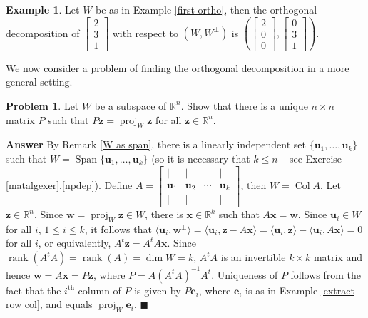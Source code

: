 \documentclass[12pt,letterpaper]{book}
\numberwithin{equation}{section}
\theoremstyle{definition}
\newtheorem{problem}[thm]{\textbf{Problem}}
\newtheorem{example}[thm]{\textbf{Example}}
\newenvironment{answer}{\noindent\textbf{Answer}}{\hfill$\blacksquare$\vspace{0.1in}}
\newcommand{\vu}{\bm{u}}
\newcommand{\vw}{\bm{w}}
\newcommand{\vx}{\bm{x}}
\newcommand{\vz}{\bm{z}}
\newcommand{\Coll}{\operatorname{Col}}
\newcommand{\Span}{\operatorname{Span}}
\newcommand{\rank}{\operatorname{rank}}
\begin{document}
\begin{example}
Let $W$ be as in Example \ref{first ortho}, then the orthogonal decomposition of $\left[\begin{array}{r} 2 \\ 3 \\ 1 \end{array}\right]$ with respect to $(W,W^\perp)$ is $\left(\left[\begin{array}{r} 2 \\ 0 \\ 0 \end{array}\right], \left[\begin{array}{r} 0 \\ 3 \\ 1 \end{array}\right]\right)$.
\end{example}

We now consider a problem of finding the orthogonal decomposition in a more general setting.

\begin{problem}\label{gensol}
Let $W$ be a subspace of $\mathbb{R}^n$. Show that there is a unique $n\times n$ matrix $P$ such that $P\vz=\operatorname{proj}_W \vz$ for all $\vz \in \mathbb{R}^n$.
\end{problem}

\begin{answer}
By Remark \ref{W as span}, there is a linearly independent set $\{\vu_1,\ldots,\vu_k\}$ such that $W=\Span\{\vu_1,\ldots,\vu_k\}$ (so it is necessary that $k\leq n$ -- see Exercise \ref{matalgexer}.\ref{npdep}). Define $A=\left[\begin{array}{cccc} | & | &   & | \\ \vu_1 & \vu_2 & \cdots & \vu_k \\ | & | &  & | \end{array}\right]$, then $W=\Coll A$. Let $\vz\in \mathbb{R}^n$. Since $\vw=\operatorname{proj}_W \vz \in W$, there is $\vx\in \mathbb{R}^k$ such that $A\vx=\vw$. Since $\vu_i\in W$ for all $i$, $1\leq i \leq k$, it follows that $\langle \vu_i, \vw^\perp\rangle =\langle \vu_i, \vz-A\vx \rangle= \langle \vu_i, \vz\rangle -\langle \vu_i, A\vx \rangle=0$ for all $i$, or equivalently, $A^t\vz=A^tA\vx$. Since $\rank(A^tA)=\rank (A)=\dim W=k$, $A^tA$ is an invertible $k \times k$ matrix and hence $\vw=A\vx=P\vz$, where $P=A(A^tA)^{-1}A^t$. Uniqueness of $P$ follows from the fact that the $i^{\text{th}}$ column of $P$ is given by $P\bm{e}_i$, where $\bm{e}_i$ is as in Example \ref{extract row col}, and equals $\operatorname{proj}_W \bm{e}_i$.
\end{answer}
\end{document}

